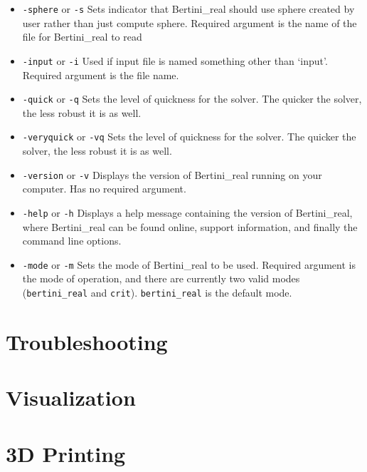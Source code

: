 \documentclass[10pt]{article}
\begin{document}
\begin {itemize}
\item \texttt{-sphere} or \texttt{-s} \newline Sets indicator that Bertini\_real should use sphere created by user rather than just compute sphere. Required argument is the name of the file for Bertini\_real to read
\item \texttt{-input}  or \texttt {-i} \newline Used if input file is named something other than `input'. Required argument is the file name. 
\item \texttt{-quick} or \texttt{-q} \newline Sets the level of quickness for the solver. The quicker the solver, the less robust it is as well. 
\item \texttt{-veryquick} or \texttt{-vq} \newline Sets the level of quickness for the solver. The quicker the solver, the less robust it is as well. 
\item \texttt{-version} or \texttt{-v} \newline Displays the version of Bertini\_real running on your computer. Has no required argument. 
\item \texttt{-help}  or \texttt{-h} \newline Displays a help message containing the version of Bertini\_real, where Bertini\_real can be found online, support information, and finally the command line options.
\item \texttt{-mode} or \texttt{-m} \newline Sets the mode of Bertini\_real to be used. Required argument is the mode of operation, and there are currently two valid modes (\texttt{bertini\_real} and \texttt{crit}). \texttt{bertini\_real} is the default mode. 
\end{itemize}



\section{Troubleshooting}

\section{Visualization}

\section{3D Printing}
\end{document}
